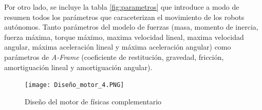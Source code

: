 Por otro lado, se incluye la tabla \ref{fig:parametros} que introduce a modo de resumen todos los parámetros que caraceterizan el movimiento
de los robots autónomos. Tanto parámetros del modelo de fuerzas (masa, momento de inercia, fuerza máxima, torque máximo, maxima velocidad lineal, maxima velocidad angular, máxima aceleración lineal y máxima aceleración angular) como parámetros de \textit{A-Frame} (coeficiente de restitución, gravedad, fricción, amortiguación lineal y amortiguación angular).

\begin{figure}[h!]
    \centering
    \texttt{[image: Diseño\_motor\_4.PNG]}
    \caption{Diseño del motor de físicas complementario\footnotemark}
    \label{fig:motor_diseño}
\end{figure}

